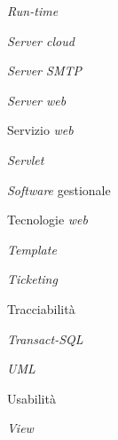 \begin{enumerate}[label={[\arabic*]}]
	\item \textit{Run-time} 
	\item \textit{Server cloud} 
	\item \textit{Server SMTP} 
	\item \textit{Server web} 
	\item Servizio \textit{web} 
	\item \textit{Servlet} 
	\item \textit{Software} gestionale 
	\item Tecnologie \textit{web} 
	\item \textit{Template}
	\item \textit{Ticketing} 
	\item Tracciabilità 
	\item \textit{Transact-SQL} 
	\item \textit{UML} 
	\item Usabilità 
	\item \textit{View}
\end{enumerate}
